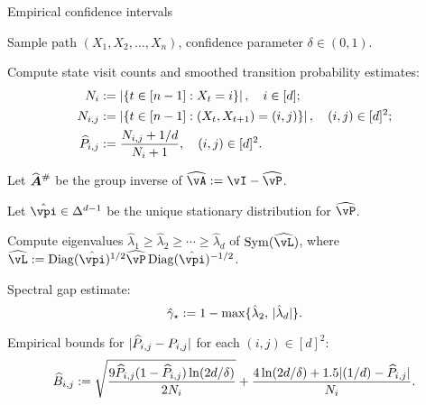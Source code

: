 \begin{algorithm}
\caption{Empirical confidence intervals}
\label{alg:empest}
\begin{algorithmic}[1]
  \renewcommand\algorithmicrequire{\textbf{Input}:}
  \REQUIRE
    Sample path $(X_1,X_2,\dots,X_n)$,
    confidence parameter $\delta \in (0,1)$.

  \STATE Compute state visit counts and smoothed transition
  probability estimates:
  \begin{equation}
    \begin{aligned}
      N_i & :=
      \left|
        \left\{
          t \in [n-1] : X_t = i
        \right\}
      \right|
      , \quad i \in [d] ; \\
      N_{i,j} & :=
      \left|
        \left\{
          t \in [n-1] : (X_t,X_{t+1}) = (i,j)
        \right\}
      \right|
      , \quad (i,j) \in [d]^2 ; \\
      \widehat{P}_{i,j}
      & :=
      \frac{N_{i,j} + 1/d}{N_i + 1}
      , \quad (i,j) \in [d]^2 .
    \end{aligned}
    \notag
  \end{equation}
  \label{step:P}

  \STATE Let $\giAh$ be the group inverse of $\wh\vA := \vI -
  \wh\vP$.
  \label{step:gi}

  \STATE Let $\hat\vpi \in \Delta^{d-1}$ be the unique stationary
  distribution for $\wh\vP$.
  \label{step:pi}

  \STATE Compute eigenvalues $\hat\lambda_1 {\geq} \hat\lambda_2
  {\geq} \dotsb {\geq} \hat\lambda_d$ of $\Sym(\wh\vL)$, where $\wh\vL
  := \Diag(\hat\vpi)^{1/2} \wh\vP \Diag(\hat\vpi)^{-1/2}$.
  \label{step:eig}

  \STATE Spectral gap estimate:
  \[ \hat\gamma_{\star} := 1 - \max\{ \hat\lambda_2,\, |\hat\lambda_d| \} . \]
  \label{step:gap}

  \STATE Empirical bounds for $|\widehat{P}_{i,j}-P_{i,j}|$ for each $(i,j)
  \in [d]^2$:
  \begin{equation}
    \widehat{B}_{i,j}
    :=
    \sqrt{\frac{9\widehat{P}_{i,j}(1-\widehat{P}_{i,j})\ln(2d/\delta)}{2N_i}}
    + \frac{4\ln(2d/\delta)+1.5|(1/d)-\widehat{P}_{i,j}|}{N_i}
    .
    \notag
  \end{equation}
  \label{step:P-bound}



\end{algorithmic}
\end{algorithm}
